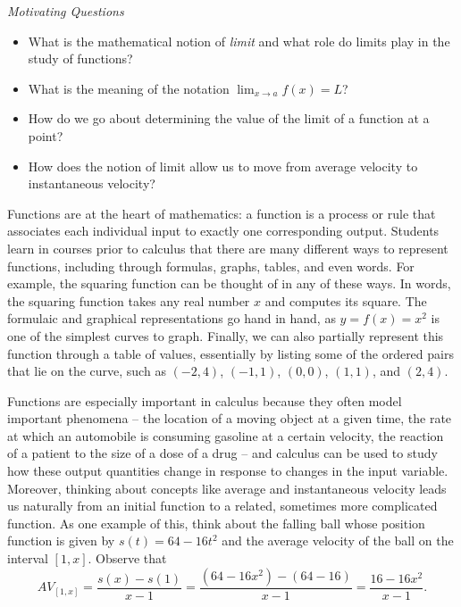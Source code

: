 \documentclass[10pt,]{book}
\theoremstyle{plain}
\theoremstyle{definition}
\theoremstyle{definition}
\theoremstyle{definition}
\theoremstyle{definition}
\theoremstyle{definition}
\numberwithin{equation}{section}
\begin{document}
\emph{Motivating Questions}
%
\leavevmode%
\begin{itemize}[label=\textbullet]
\item{}What is the mathematical notion of \emph{limit} and what role do limits play in the study of functions?%
\item{}What is the meaning of the notation \(\lim_{x \to a} f(x) = L\)?%
\item{}How do we go about determining the value of the limit of a function at a point?%
\item{}How does the notion of limit allow us to move from average velocity to instantaneous velocity?%
\end{itemize}
\par

Functions are at the heart of mathematics: a function is a process or rule that associates each individual input to exactly one corresponding output. Students learn in courses prior to calculus that there are many different ways to represent functions, including through formulas, graphs, tables, and even words. For example, the squaring function can be thought of in any of these ways. In words, the squaring function takes any real number \(x\) and computes its square. The formulaic and graphical representations go hand in hand, as \(y = f(x) = x^2\) is one of the simplest curves to graph. Finally, we can also partially represent this function through a table of values, essentially by listing some of the ordered pairs that lie on the curve, such as \((-2,4)\), \((-1,1)\), \((0,0)\), \((1,1)\), and \((2,4)\).
%
\par

Functions are especially important in calculus because they often model important phenomena -- the location of a moving object at a given time, the rate at which an automobile is consuming gasoline at a certain velocity, the reaction of a patient to the size of a dose of a drug -- and calculus can be used to study how these output quantities change in response to changes in the input variable. Moreover, thinking about concepts like average and instantaneous velocity leads us naturally from an initial function to a related, sometimes more complicated function. As one example of this, think about the falling ball whose position function is given by \(s(t) = 64 - 16t^2\) and the average velocity of the ball on the interval \([1,x]\). Observe that
%
\begin{equation*}
AV_{[1,x]} = \frac{s(x) - s(1)}{x-1} = \frac{(64-16x^2) - (64-16)}{x-1} = \frac{16 - 16x^2}{x-1}.
\end{equation*}\par
\end{document}
